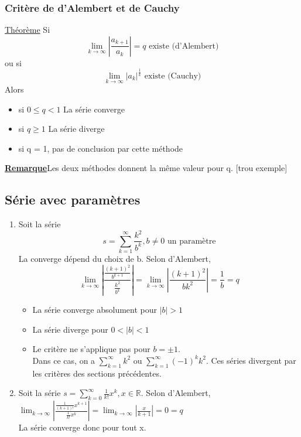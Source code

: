 \documentclass[12pt,a4paper]{article}
\newcommand{\somme}[2]{\ensuremath{\sum\limits_{#2}^{#1}}}
\newcommand{\limite}{\lim\limits_}
\newcommand{\evid}[1]{\textbf{\underline{#1}}}
\newcommand{\Theoreme}{\underline{Théorème} }
\begin{document}
{\subsubsection{Critère de d'Alembert et de Cauchy}
\begin{boite}
\Theoreme Si \begin{equation}
\limite{k \to \infty} \left|\frac{a_{k+1}}{a_k}\right| = q \mbox{ existe (d'Alembert)}
\end{equation}
ou si 
\begin{equation}
\limite{k\to\infty}|a_k|^{\frac{1}{k}} \mbox{ existe (Cauchy)}
\end{equation}
Alors
\begin{itemize}
	\item si $0\leq q < 1$ La série converge
	\item si $q \geq 1$ La série diverge
	\item si q = 1, pas de conclusion par cette méthode
\end{itemize}
\end{boite}
\evid{Remarque}Les deux méthodes donnent la même valeur pour q.
[trou exemple]
\subsection{Série avec paramètres}
\begin{enumerate}
	\item Soit la série 
		\begin{equation}
			s = \somme{\infty}{k=1}\frac{k^2}{b^k}, b \neq 0\mbox{ un paramètre}
		\end{equation}
		La converge dépend du choix de b. Selon d'Alembert, 
		\begin{equation}
		\limite{k\to \infty}\left| \frac{\frac{(k+1)^2}{b^{k + 1}}}{\frac{k^2}{b^k}} \right| =  \limite{k\to\infty}\left| \frac{(k+1)^2}{bk^2} \right| = \frac{1}{b} = q
		\end{equation}
		\begin{itemize}
			\item La série converge absolument pour $|b| > 1$
			\item La série diverge pour $0 < |b| < 1$
			\item Le critère ne s'applique pas pour $b = \pm 1$.\\
			Dans ce cas, on a $\somme{\infty}{k=1}k^2$ ou $\somme{\infty}{k=1}(-1)^kk^2$. 
			Ces séries divergent par les critères des sections précédentes.
		\end{itemize}
	\item Soit la série $s = \sum_{k=0}^{\infty} \frac{1}{k!} x^k, x \in \mathbb{R}$. Selon d'Alembert, \\ $\lim_{k \rightarrow \infty} \left| \frac{ \frac{1}{(k+1)!} x^{k+1} }{\frac{1}{k!} x^k} \right| = \lim_{k \rightarrow \infty} \left| \frac{x}{k+1} \right| = 0 = q$\\
		La série converge donc pour tout x. 
\end{enumerate}
}
\end{document}
